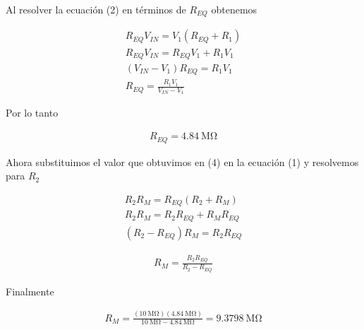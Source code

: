 \documentclass{article}
\begin{document}
	Al resolver la ecuación (2) en términos de $R_{EQ}$ obtenemos
	
	\begin{align}
		R_{EQ}V_{IN} = 	V_1(R_{EQ} + R_1) \nonumber \\
		R_{EQ}V_{IN} = R_{EQ}V_1 + R_1V_1 \nonumber \\
		(V_{IN} - V_1)R_{EQ} = R_1V_1 \nonumber \\
		R_{EQ} = \frac{R_1V_1}{V_{IN} - V_1} 
	\end{align}
	
	Por lo tanto
	
	\begin{align}
		R_{EQ} = \qty{4.84}{\mega\ohm}
	\end{align}
	 
	 Ahora substituimos el valor que obtuvimos en (4) en la ecuación (1) y resolvemos para $R_2$

	
	\begin{align}
		R_2R_M = R_{EQ}(R_2 + R_M) \nonumber \\
		R_2R_M = R_2R_{EQ} + R_MR_{EQ} \nonumber \\
		(R_2 - R_{EQ})R_M = R_2R_{EQ} \nonumber
	\end{align}
	 
	 \begin{align}
	 	R_M = \frac{R_2R_{EQ}}{R_2 - R_{EQ}}
	 \end{align}

Finalmente

\begin{align}
	R_M = \frac{(\qty{10}{\mega\ohm}) (\qty{4.84}{\mega\ohm})}{\qty{10}{\mega\ohm} - \qty{4.84}{\mega\ohm}} = \qty{9.3798}{\mega\ohm}
\end{align}
	
\end{document}
